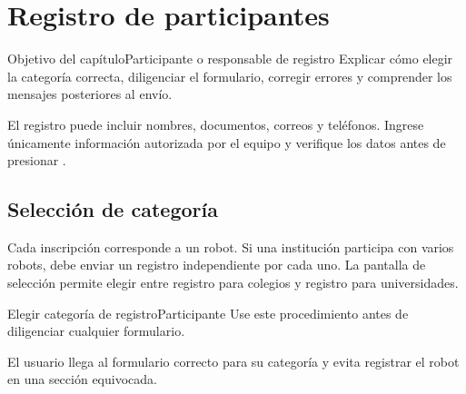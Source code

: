 \chapter{Registro de participantes}
\label{cap:registro-participantes}

\begin{procedimiento}{Objetivo del capítulo}{Participante o responsable de registro}
Explicar cómo elegir la categoría correcta, diligenciar el formulario, corregir errores y comprender los mensajes posteriores al envío.
\end{procedimiento}

\begin{advertencia}
El registro puede incluir nombres, documentos, correos y teléfonos. Ingrese únicamente información autorizada por el equipo y verifique los datos antes de presionar .
\end{advertencia}

\section{Selección de categoría}

Cada inscripción corresponde a un robot. Si una institución participa con varios robots, debe enviar un registro independiente por cada uno. La pantalla de selección permite elegir entre registro para colegios y registro para universidades.


\begin{procedimiento}{Elegir categoría de registro}{Participante}
Use este procedimiento antes de diligenciar cualquier formulario.
\end{procedimiento}


\begin{resultadoesperado}
El usuario llega al formulario correcto para su categoría y evita registrar el robot en una sección equivocada.
\end{resultadoesperado}

